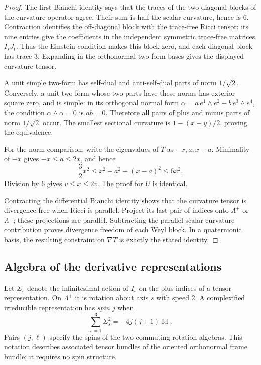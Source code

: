 \begin{proof}
The first Bianchi identity says that the traces of the two diagonal
blocks of the curvature operator agree. Their sum is half the scalar
curvature, hence is $6$. Contraction identifies the off-diagonal block
with the trace-free Ricci tensor: its nine entries give the coefficients
in the independent symmetric trace-free matrices $I_sJ_t$.
Thus the Einstein condition makes this block zero, and each diagonal
block has trace $3$. Expanding in the orthonormal two-form bases gives
the displayed curvature tensor.

A unit simple two-form has self-dual and anti-self-dual parts of norm
$1/\sqrt2$. Conversely, a unit two-form whose two parts have these
norms has exterior square zero, and is simple: in its orthogonal
normal form $\alpha=a\,e^1\wedge e^2+b\,e^3\wedge e^4$, the condition
$\alpha\wedge\alpha=0$ is $ab=0$. Therefore all pairs of plus and minus
parts of norm $1/\sqrt2$ occur. The smallest sectional curvature is
$1-(x+y)/2$, proving the equivalence.

For the norm comparison, write the eigenvalues of $T$ as
$-x,a,x-a$. Minimality of $-x$ gives $-x\le a\le2x$, and hence
\[
 \frac32x^2
 \le x^2+a^2+(x-a)^2
 \le6x^2.
\]
Division by $6$ gives $v\le x\le2v$. The proof for $U$ is identical.

Contracting the differential Bianchi identity shows that the curvature
tensor is divergence-free when Ricci is parallel. Project its last
pair of indices onto $\Lambda^+$ or $\Lambda^-$; these projections
are parallel. Subtracting the parallel scalar-curvature contribution
proves divergence freedom of each Weyl block. In a quaternionic basis,
the resulting constraint on $\nabla T$ is exactly the stated identity.
\end{proof}

\subsection{Algebra of the derivative representations}

Let $\Sigma_s$ denote the infinitesimal action of $I_s$ on the plus
indices of a tensor representation. On $\Lambda^+$ it is rotation
about axis $s$ with speed $2$. A complexified irreducible representation
has \emph{spin $j$} when
\[
 \sum_{s=1}^3\Sigma_s^2=-4j(j+1)\operatorname{Id}.
\]
Pairs $(j,\ell)$ specify the spins of the two commuting rotation
algebras. This notation describes associated tensor bundles of the
oriented orthonormal frame bundle; it requires no spin structure.

